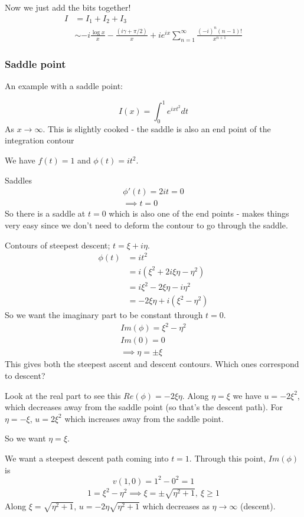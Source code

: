 \documentclass{X:/Documents/Coding/Latex/myassignment}
\begin{document}
Now we just add the bits together!
\begin{align*}
    I &= I_1 + I_2 + I_3\\
    &\sim -i\frac{\log x}{x} - \frac{(i\gamma + \pi/2)}{x} + ie^{ix} \sum_{n=1}^\infty \frac{(-i)^n (n-1)!}{x^{n+1}}
\end{align*}


\subsubsection{Saddle point}
An example with a saddle point:

\[I(x) = \int_0^1 e^{ixt^2}dt\]
As $x\to\infty$. This is slightly cooked - the saddle is also an end point of the integration contour

We have $f(t) =1$ and $\phi(t) = it^2$.

Saddles
\begin{align*}
    \phi'(t) = 2it= 0\\
    \implies t=0
\end{align*}
So there is a saddle at $t=0$ which is also one of the end points - makes things very easy since we don't need to deform the contour to go through the saddle.

Contours of steepest descent; $t=\xi + i\eta$. 
\begin{align*}
    \phi(t) &= it^2\\
    &=i\left(\xi^2 +2i\xi \eta -\eta^2\right)\\
    &= i\xi^2 - 2\xi \eta - i\eta^2\\
    &= -2\xi\eta + i(\xi^2-\eta^2)
\end{align*}
So we want the imaginary part to be constant through $t=0$.
\begin{align*}
    Im(\phi) = \xi^2 -\eta^2\\
    Im(0) = 0 \\
    \implies \eta = \pm \xi
\end{align*}
This gives both the steepest ascent and descent contours. Which ones correspond to descent?

Look at the real part to see this $Re(\phi) = -2\xi\eta$. Along $\eta = \xi$ we have $u=-2\xi^2$, which decreases away from the saddle point (so that's the descent path). For $\eta = -\xi$, $u = 2\xi^2$ which increases away from the saddle point.

So we want $\eta = \xi$.


We want a steepest descent path coming into $t=1$. Through this point, $Im(\phi)$ is
\[v(1,0) = 1^2-0^2 = 1\]
\begin{align*}
    1 = \xi^2 - \eta^2 \implies \xi = \pm \sqrt{\eta^2 + 1}, \ \xi \geq 1
\end{align*}
Along $\xi = \sqrt{\eta^2 + 1}$, $u= -2\eta \sqrt{\eta^2 + 1}$ which decreases as $\eta \to \infty$ (descent).
\end{document}
